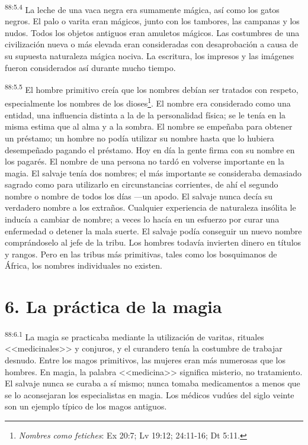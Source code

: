 \documentclass[twoside, 11pt]{book}
\begin{document}
\par
\textsuperscript{88:5.4} La leche de una vaca negra era sumamente mágica, así como los gatos negros. El palo o varita eran mágicos, junto con los tambores, las campanas y los nudos. Todos los objetos antiguos eran amuletos mágicos. Las costumbres de una civilización nueva o más elevada eran consideradas con desaprobación a causa de su supuesta naturaleza mágica nociva. La escritura, los impresos y las imágenes fueron considerados así durante mucho tiempo.

\par
\textsuperscript{88:5.5} El hombre primitivo creía que los nombres debían ser tratados con respeto, especialmente los nombres de los dioses\footnote{\textit{Nombres como fetiches}: Ex 20:7; Lv 19:12; 24:11-16; Dt 5:11.}. El nombre era considerado como una entidad, una influencia distinta a la de la personalidad física; se le tenía en la misma estima que al alma y a la sombra. El nombre se empeñaba para obtener un préstamo; un hombre no podía utilizar su nombre hasta que lo hubiera desempeñado pagando el préstamo. Hoy en día la gente firma con su nombre en los pagarés. El nombre de una persona no tardó en volverse importante en la magia. El salvaje tenía dos nombres; el más importante se consideraba demasiado sagrado como para utilizarlo en circunstancias corrientes, de ahí el segundo nombre o nombre de todos los días ---un apodo. El salvaje nunca decía su verdadero nombre a los extraños. Cualquier experiencia de naturaleza insólita le inducía a cambiar de nombre; a veces lo hacía en un esfuerzo por curar una enfermedad o detener la mala suerte. El salvaje podía conseguir un nuevo nombre comprándoselo al jefe de la tribu. Los hombres todavía invierten dinero en títulos y rangos. Pero en las tribus más primitivas, tales como los bosquimanos de África, los nombres individuales no existen.

\section*{6. La práctica de la magia}
\par
\textsuperscript{88:6.1} La magia se practicaba mediante la utilización de varitas, rituales <<medicinales>> y conjuros, y el curandero tenía la costumbre de trabajar desnudo. Entre los magos primitivos, las mujeres eran más numerosas que los hombres. En magia, la palabra <<medicina>> significa misterio, no tratamiento. El salvaje nunca se curaba a sí mismo; nunca tomaba medicamentos a menos que se lo aconsejaran los especialistas en magia. Los médicos vudúes del siglo veinte son un ejemplo típico de los magos antiguos.
\end{document}
